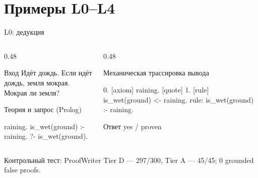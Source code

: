 \documentclass[aspectratio=169,11pt]{beamer}
\newcommand{\Prov}[1]{\textcolor{provencolor}{#1}}
\begin{document}
\section{Примеры L0--L4}

\begin{frame}[fragile]{L0: дедукция}
  \footnotesize
  \begin{columns}[T,onlytextwidth]
    \begin{column}{0.48\textwidth}
      \begin{block}{Вход}
        Идёт дождь. Если идёт дождь, земля мокрая.\\
        Мокрая ли земля?
      \end{block}
      \begin{block}{Теория и запрос (Prolog)}
\begin{semiverbatim}
\scriptsize
raining.
is_wet(ground) :- raining.
?- is_wet(ground).
\end{semiverbatim}
      \end{block}
    \end{column}
    \begin{column}{0.48\textwidth}
      \begin{block}{Механическая трассировка вывода}
\begin{semiverbatim}
\scriptsize
0. [axiom] raining. [quote]
1. [rule] is_wet(ground) <- raining.
   rule: is_wet(ground) :- raining.
\end{semiverbatim}
      \end{block}
      \begin{block}{Ответ}
        \Prov{yes / proven}
      \end{block}
    \end{column}
  \end{columns}

  \vspace{1mm}
  {\scriptsize Контрольный тест: ProofWriter Tier D --- 297/300, Tier A --- 45/45;
  0 grounded false proofs.}
\end{frame}
\end{document}
